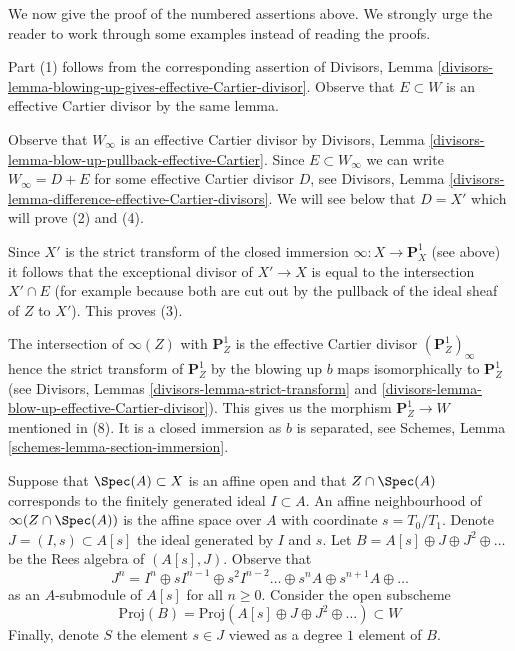 \medskip\noindent
We now give the proof of the numbered assertions above. We strongly
urge the reader to work through some examples instead of reading the
proofs.

\medskip\noindent
Part (1) follows from the corresponding assertion of Divisors, Lemma
\ref{divisors-lemma-blowing-up-gives-effective-Cartier-divisor}.
Observe that $E \subset W$ is an effective Cartier divisor by the same lemma.

\medskip\noindent
Observe that $W_\infty$ is an effective Cartier divisor by
Divisors, Lemma \ref{divisors-lemma-blow-up-pullback-effective-Cartier}.
Since $E \subset W_\infty$ we can write $W_\infty = D + E$ for some
effective Cartier divisor $D$, see
Divisors, Lemma \ref{divisors-lemma-difference-effective-Cartier-divisors}.
We will see below that $D = X'$ which will prove (2) and (4).

\medskip\noindent
Since $X'$ is the strict transform of the closed immersion
$\infty : X \to \mathbf{P}^1_X$ (see above) it follows that the exceptional
divisor of $X' \to X$ is equal to the intersection $X' \cap E$
(for example because both are cut out by the pullback of the
ideal sheaf of $Z$ to $X'$). This proves (3).

\medskip\noindent
The intersection of $\infty(Z)$ with $\mathbf{P}^1_Z$ is the effective
Cartier divisor $(\mathbf{P}^1_Z)_\infty$ hence the strict transform
of $\mathbf{P}^1_Z$ by the blowing up $b$ maps isomorphically to
$\mathbf{P}^1_Z$ (see Divisors, Lemmas \ref{divisors-lemma-strict-transform}
and \ref{divisors-lemma-blow-up-effective-Cartier-divisor}).
This gives us the morphism $\mathbf{P}^1_Z \to W$ mentioned in (8).
It is a closed immersion as $b$ is separated, see
Schemes, Lemma \ref{schemes-lemma-section-immersion}.

\medskip\noindent
Suppose that $\Spec(A) \subset X$ is an affine open and that $Z \cap \Spec(A)$
corresponds to the finitely generated ideal $I \subset A$.
An affine neighbourhood of $\infty(Z \cap \Spec(A))$ is the
affine space over $A$ with coordinate $s = T_0/T_1$. Denote
$J = (I, s) \subset A[s]$ the ideal generated by $I$ and $s$.
Let $B = A[s] \oplus J \oplus J^2 \oplus \ldots$ be the Rees algebra
of $(A[s], J)$. Observe that
$$
J^n =
I^n \oplus sI^{n - 1} \oplus s^2I^{n - 2} \ldots \oplus s^nA
\oplus s^{n + 1}A \oplus \ldots
$$
as an $A$-submodule of $A[s]$ for all $n \geq 0$. Consider the open subscheme
$$
\text{Proj}(B) = \text{Proj}(A[s] \oplus J \oplus J^2 \oplus \ldots)
\subset W
$$
Finally, denote $S$ the element $s \in J$ viewed as a degree $1$ element
of $B$.

